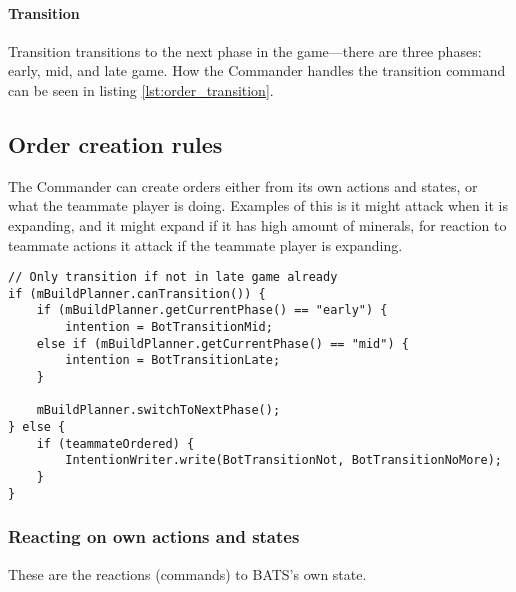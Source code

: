 \paragraph{Transition}
Transition transitions to the next phase in the game—there are three phases: early, mid, and late
game. How the Commander handles the transition command can be seen in listing
\ref{lst:order_transition}.

\subsection{Order creation rules}
The Commander can create orders either from its own actions and states, or what the teammate player
is doing. Examples of this is it might attack when it is expanding, and it might expand if it has
high amount of minerals, for reaction to teammate actions it attack if the teammate player is
expanding.
\clearpage
\begin{lstlisting}[label={lst:order_transition},caption={Pseudo-code for transition command}]
// Only transition if not in late game already
if (mBuildPlanner.canTransition()) {
	if (mBuildPlanner.getCurrentPhase() == "early") {
		intention = BotTransitionMid;
	else if (mBuildPlanner.getCurrentPhase() == "mid") {
		intention = BotTransitionLate;
	}

	mBuildPlanner.switchToNextPhase();
} else {
	if (teammateOrdered) {
		IntentionWriter.write(BotTransitionNot, BotTransitionNoMore);
	}
}
\end{lstlisting}

\subsubsection{Reacting on own actions and states}
\label{sec:react_own}
These are the reactions (commands) to BATS's own state.

